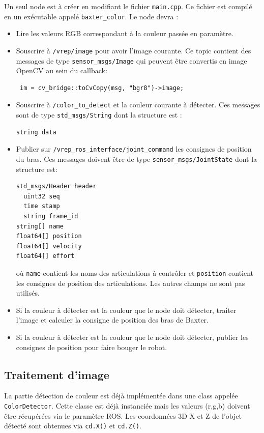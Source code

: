 \documentclass{ecnreport}
\begin{document}
Un seul node est à créer en modifiant le fichier \texttt{main.cpp}. Ce fichier est compilé en un exécutable appelé \texttt{baxter\_color}. 
Le node devra :
\begin{itemize}
\item Lire les valeurs RGB correspondant à la couleur passée en paramètre.
\item Souscrire à \texttt{/vrep/image} pour avoir l'image courante. Ce topic contient des messages de type \texttt{sensor\_msgs/Image} qui peuvent être convertis en image OpenCV au sein du callback:
\cppstyle
\begin{lstlisting}
 im = cv_bridge::toCvCopy(msg, "bgr8")->image; 
\end{lstlisting}
\item Souscrire à \texttt{/color\_to\_detect} et la couleur courante à détecter. Ces messages sont de type \texttt{std\_msgs/String} dont la structure est :
\begin{lstlisting}
string data
\end{lstlisting} 
 \item Publier sur \texttt{/vrep\_ros\_interface/joint\_command} les consignes de position du bras. Ces messages doivent être de type \texttt{sensor\_msgs/JointState} dont la structure est:
\begin{lstlisting}
std_msgs/Header header
  uint32 seq
  time stamp
  string frame_id
string[] name
float64[] position
float64[] velocity
float64[] effort
 \end{lstlisting} où \texttt{name} contient les noms des articulations à contrôler et \texttt{position} contient les consignes de position des articulations. Les autres champs
 ne sont pas utilisés.
 \item Si la couleur à détecter est la couleur que le node doit détecter, traiter l'image et calculer la consigne de position des bras de Baxter.
 \item Si la couleur à détecter est la couleur que le node doit détecter, publier les consignes de position pour faire bouger le robot.
\end{itemize}

\subsection{Traitement d'image}

La partie détection de couleur est déjà implémentée dans une class appelée  \texttt{ColorDetector}. Cette classe est déjà instanciée mais les valeurs (r,g,b) doivent être 
récupérées via le paramètre ROS. Les coordonnées 3D X et Z de l'objet détecté sont obtenues via \texttt{cd.X()} et \texttt{cd.Z()}.
\end{document}
